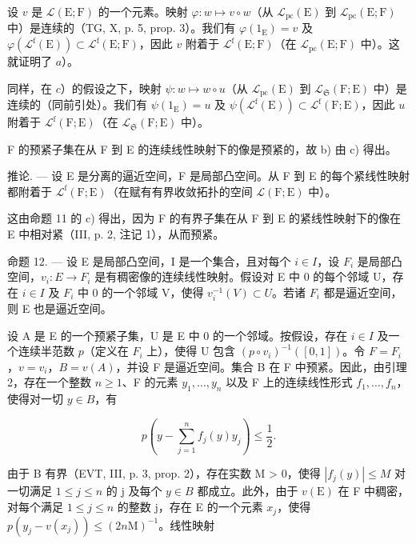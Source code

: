 设 \(v\) 是 \(\mathcal{L}(\mathrm{E};\mathrm{F})\) 的一个元素。映射 \(\varphi\colon w\mapsto v\circ w\)（从 \(\mathcal{L}_{\mathrm{pc}}(\mathrm{E})\) 到 \(\mathcal{L}_{\mathrm{pc}}(\mathrm{E};\mathrm{F})\) 中）是连续的（TG, X, p. 5, prop. 3）。我们有 \(\varphi(1_{\mathrm{E}})=v\) 及 \(\varphi(\mathcal{L}^{\mathrm{f}}(\mathrm{E}))\subset\mathcal{L}^{\mathrm{f}}(\mathrm{E};\mathrm{F})\)，因此 \(v\) 附着于 \(\mathcal{L}^{\mathrm{f}}(\mathrm{E};\mathrm{F})\)（在 \(\mathcal{L}_{\mathrm{pc}}(\mathrm{E};\mathrm{F})\) 中）。这就证明了 \(a\)）。

同样，在 \(c\)）的假设之下，映射 \(\psi: w \mapsto w \circ u\)（从 \(\mathcal{L}_{\mathrm{pc}}(\mathrm{E})\) 到 \(\mathcal{L}_{\mathfrak{S}}(\mathrm{F};\mathrm{E})\) 中）是连续的（同前引处）。我们有 \(\psi(1_{\mathrm{E}}) = u\) 及 \(\psi(\mathcal{L}^{\mathrm{f}}(\mathrm{E})) \subset \mathcal{L}^{\mathrm{f}}(\mathrm{F};\mathrm{E})\)，因此 \(u\) 附着于 \(\mathcal{L}^{\mathrm{f}}(\mathrm{F};\mathrm{E})\)（在 \(\mathcal{L}_{\mathfrak{S}}(\mathrm{F};\mathrm{E})\) 中）。

F 的预紧子集在从 F 到 E 的连续线性映射下的像是预紧的，故 b) 由 c) 得出。

推论. --- 设 E 是分离的逼近空间，F 是局部凸空间。从 F 到 E 的每个紧线性映射都附着于 \(\mathcal{L}^{\mathrm{f}}(\mathrm{F};\mathrm{E})\)（在赋有有界收敛拓扑的空间 \(\mathcal{L}(\mathrm{F};\mathrm{E})\) 中）。

这由命题 11 的 c) 得出，因为 F 的有界子集在从 F 到 E 的紧线性映射下的像在 E 中相对紧（III, p. 2, 注记 1），从而预紧。

命题 12. --- 设 E 是局部凸空间，I 是一个集合，且对每个 \(i \in I\)，设 \(F_{i}\) 是局部凸空间，\(v_{i}: E \to F_{i}\) 是有稠密像的连续线性映射。假设对 E 中 0 的每个邻域 U，存在 \(i \in I\) 及 \(F_{i}\) 中 0 的一个邻域 V，使得 \(v_{i}^{-1}(V) \subset U\)。若诸 \(F_{i}\) 都是逼近空间，则 E 也是逼近空间。

设 A 是 E 的一个预紧子集，U 是 E 中 0 的一个邻域。按假设，存在 \(i \in I\) 及一个连续半范数 \(p\)（定义在 \(F_i\) 上），使得 U 包含 \((p \circ v_i)^{-1}([0,1])\)。令 \(F = F_i\)，\(v = v_i\)，\(B = v(A)\)，并设 F 是逼近空间。集合 B 在 F 中预紧。因此，由引理 2，存在一个整数 \(n \geqslant 1\)、F 的元素 \(y_1, \ldots, y_n\) 以及 F 上的连续线性形式 \(f_1, \ldots, f_n\)，使得对一切 \(y \in B\)，有

\[
p \left(y - \sum_ {j = 1} ^ {n} f _ {j} (y) y _ {j}\right) \leqslant \frac {1}{2}.
\]

由于 B 有界（EVT, III, p. 3, prop. 2），存在实数 M > 0，使得 \(|f_{j}(y)| \leqslant M\) 对一切满足 \(1 \leqslant j \leqslant n\) 的 j 及每个 \(y \in B\) 都成立。此外，由于 \(v(\mathrm{E})\) 在 F 中稠密，对每个满足 \(1 \leqslant j \leqslant n\) 的整数 j，存在 E 的一个元素 \(x_{j}\)，使得 \(p(y_{j} - v(x_{j})) \leqslant (2n\mathrm{M})^{-1}\)。线性映射

